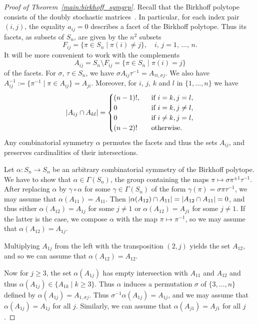 \documentclass[10pt]{amsart}
\renewcommand{\geq}{\geqslant}
\DeclarePairedDelimiter{\card}{\lvert}{\rvert}
\begin{document}
\begin{proof}[Proof of Theorem~\ref{main:birkhoff_symgrp}]
  Recall that the Birkhoff polytope consists of the doubly
  stochastic matrices~\cite[Corollary~1.4.14]{LovaszPlummer86}.
  In particular, for each index pair $(i,j)$,
  the equality
  $a_{ij}=0$ describes a facet of the Birkhoff polytope.
  Thus its facets, as subsets of $S_n$, are given by
  the $n^2$ subsets
  \[ F_{ij} = \{\pi\in S_n \mid \pi(i)\neq j \},
     \quad \text{$i$, $j=1$, $\dotsc $, $n$}.
  \]
  It will be more convenient to work with the complements
  \[ A_{ij}= S_n \setminus F_{ij}
           = \{ \pi \in S_n \mid \pi(i)=j \}
  \] 
  of the facets.
  For $\sigma$, $\tau\in S_n$, 
  we have 
  $\sigma A_{ij} \tau^{-1} = A_{\tau i, \sigma j} $.
  We also have 
  $ A_{ij}^{-1} := \{ \pi^{-1} 
                      \mid \pi \in A_{ij}
                   \}
                 = A_{ji}$.
  Moreover, for $i$, $j$, $k$ and $l$ in $\{1,\dotsc,n\}$
  we have
  \[ \card{A_{ij}\cap A_{kl}}
      =
      \begin{cases}
        (n-1)!, & \text{if } i=k, j=l, \\
        0       & \text{if } i=k, j\neq l,\\
        0       & \text{if } i\neq k, j=l, \\
        (n-2)! \quad & \text{otherwise}.
      \end{cases}
  \]  
  Any combinatorial symmetry $\alpha$ permutes the facets and thus
  the sets $A_{ij}$, and preserves cardinalities of their
  intersections.
  
  Let $\alpha\colon S_n \to S_n$ be an arbitrary
  combinatorial symmetry of the Birkhoff polytope.
  We have to show that $\alpha\in \Gamma(S_n)$,
  the group containing the maps
  $\pi \mapsto \sigma \pi^{\pm 1} \tau^{-1}$.
  After replacing $\alpha$ by $\gamma \circ \alpha$
  for some $\gamma\in \Gamma(S_n)$ of the form
  $\gamma(\pi) = \sigma \pi \tau^{-1}$,
  we may  assume that $\alpha(A_{11})= A_{11}$.
  Then $\card{\alpha(A_{12})\cap A_{11}} = \card{A_{12}\cap A_{11}}=0$,
  and thus either $\alpha(A_{12})= A_{1j}$ for some $j\neq 1$
  or $\alpha(A_{12})=A_{j1}$ for some $j\neq 1$.
  If the latter is the case, we compose $\alpha$
  with the map $\pi\mapsto \pi^{-1}$,
  so we may assume that $\alpha(A_{12})=A_{1j}$.
  
  Multiplying $A_{1j}$ from the left with the transposition
  $(2,j)$ yields the set $A_{12}$,
  and so we can assume that $\alpha(A_{12})= A_{12}$.
  
  Now for $j\geq 3$, the set $\alpha(A_{1j})$ has empty intersection
  with $A_{11}$ and $A_{12}$ and thus
  $\alpha(A_{1j}) \in \{ A_{1k}\mid k\geq 3\}$.
  Thus $\alpha$ induces a permutation 
  $\sigma$ of $\{3,\dotsc, n\}$ defined by
  $\alpha(A_{1j})= A_{1,\sigma j}$.
  Thus $\sigma^{-1} \alpha(A_{1j})= A_{1j}$,
  and we may assume that $\alpha(A_{1j})=A_{1j}$
  for all $j$.
  Similarly, we can assume that
  $\alpha(A_{j1})= A_{j1}$ for all $j$.
  

\end{proof}
\end{document}
